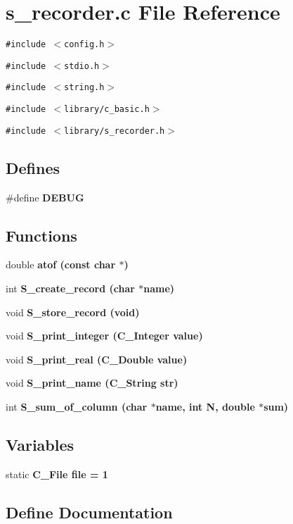 \section{s\_\-recorder.c File Reference}
\label{s__recorder_8c}
{\tt \#include $<$config.h$>$}\par
{\tt \#include $<$stdio.h$>$}\par
{\tt \#include $<$string.h$>$}\par
{\tt \#include $<$library/c\_\-basic.h$>$}\par
{\tt \#include $<$library/s\_\-recorder.h$>$}\par
\subsection*{Defines}
\begin{CompactItemize}
\item 
\#define \bf{DEBUG}
\end{CompactItemize}
\subsection*{Functions}
\begin{CompactItemize}
\item 
double \bf{atof} (const char $\ast$)
\item 
int \bf{S\_\-create\_\-record} (char $\ast$\bf{name})
\item 
void \bf{S\_\-store\_\-record} (void)
\item 
void \bf{S\_\-print\_\-integer} (\bf{C\_\-Integer} value)
\item 
void \bf{S\_\-print\_\-real} (\bf{C\_\-Double} value)
\item 
void \bf{S\_\-print\_\-name} (\bf{C\_\-String} str)
\item 
int \bf{S\_\-sum\_\-of\_\-column} (char $\ast$\bf{name}, int N, double $\ast$sum)
\end{CompactItemize}
\subsection*{Variables}
\begin{CompactItemize}
\item 
static \bf{C\_\-File} \bf{file} = 1
\end{CompactItemize}


\subsection{Define Documentation}
